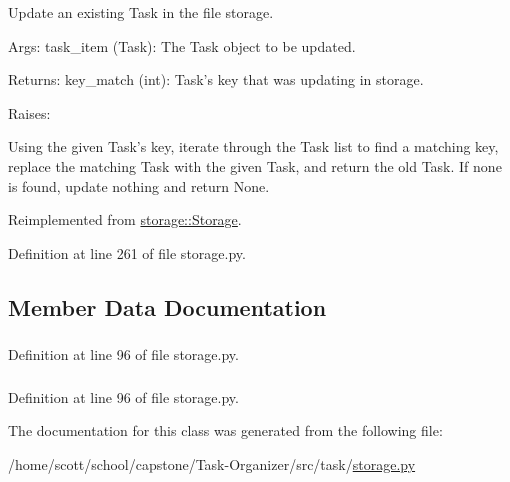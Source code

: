 \-Update an existing \-Task in the file storage. 

\-Args\-: task\-\_\-item (\-Task)\-: \-The \-Task object to be updated.

\-Returns\-: key\-\_\-match (int)\-: \-Task's key that was updating in storage.

\-Raises\-:

\-Using the given \-Task's key, iterate through the \-Task list to find a matching key, replace the matching \-Task with the given \-Task, and return the old \-Task. \-If none is found, update nothing and return \-None. 

\-Reimplemented from \hyperlink{classstorage_1_1Storage_ae0ed2cc07e30a6f350a750c7428061e9}{storage\-::\-Storage}.



\-Definition at line 261 of file storage.\-py.



\subsection{\-Member \-Data \-Documentation}
\hypertarget{classstorage_1_1FileStorage_a70122293a571deb852cdc8cf4800b0ac}{
\subsubsection[{key\-\_\-filename}]{}}
\label{classstorage_1_1FileStorage_a70122293a571deb852cdc8cf4800b0ac}


\-Definition at line 96 of file storage.\-py.

\hypertarget{classstorage_1_1FileStorage_a2a9a008a5ed06e3df5b5e45a3ff3d8e8}{
\subsubsection[{task\-\_\-filename}]{}}
\label{classstorage_1_1FileStorage_a2a9a008a5ed06e3df5b5e45a3ff3d8e8}


\-Definition at line 96 of file storage.\-py.



\-The documentation for this class was generated from the following file\-:\begin{DoxyCompactItemize}
\item 
/home/scott/school/capstone/\-Task-\/\-Organizer/src/task/\hyperlink{storage_8py}{storage.\-py}\end{DoxyCompactItemize}
